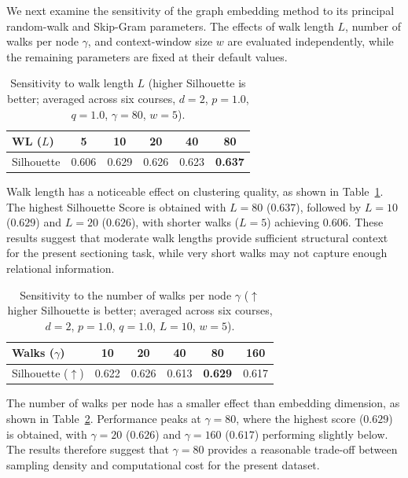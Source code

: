 \documentclass[pdflatex,sn-mathphys-num,iicol]{sn-jnl}%
\theoremstyle{thmstyleone}%
\theoremstyle{thmstyletwo}%
\theoremstyle{thmstylethree}%
\begin{document}
We next examine the sensitivity of the graph embedding method to its principal random-walk and Skip-Gram parameters. The effects of walk length $L$, number of walks per node $\gamma$, and context-window size $w$ are evaluated independently, while the remaining parameters are fixed at their default values.

\begin{table}[t]
\centering
\caption{Sensitivity to walk length $L$ (higher Silhouette is better; averaged across six courses, $d=2$, $p=1.0$, $q=1.0$, $\gamma=80$, $w=5$).}
\label{tab:sensitivity_walk}
\begin{tabular}{lccccc}
\toprule
\textbf{WL ($L$)} & 5 & 10 & 20 & 40 & 80 \\
\midrule
Silhouette& 0.606 & 0.629 & 0.626 & 0.623 & \textbf{0.637} \\
\bottomrule
\end{tabular}
\end{table}

Walk length has a noticeable effect on clustering quality, as shown in Table~\ref{tab:sensitivity_walk}. The highest Silhouette Score is obtained with $L=80$ ($0.637$), followed by $L=10$ ($0.629$) and $L=20$ ($0.626$), with shorter walks ($L=5$) achieving $0.606$. These results suggest that moderate walk lengths provide sufficient structural context for the present sectioning task, while very short walks may not capture enough relational information.

\begin{table}[t]
\centering
\caption{Sensitivity to the number of walks per node $\gamma$ ($\uparrow$ higher Silhouette is better; averaged across six courses, $d=2$, $p=1.0$, $q=1.0$, $L=10$, $w=5$).}
\label{tab:sensitivity_walks}
\begin{tabular}{lccccc}
\toprule
\textbf{Walks ($\gamma$)} & 10 & 20 & 40 & 80 & 160 \\
\midrule
Silhouette ($\uparrow$) & 0.622 & 0.626 & 0.613 & \textbf{0.629} & 0.617 \\
\bottomrule
\end{tabular}
\end{table}

The number of walks per node has a smaller effect than embedding dimension, as shown in Table~\ref{tab:sensitivity_walks}. Performance peaks at $\gamma=80$, where the highest score ($0.629$) is obtained, with $\gamma=20$ ($0.626$) and $\gamma=160$ ($0.617$) performing slightly below. The results therefore suggest that $\gamma=80$ provides a reasonable trade-off between sampling density and computational cost for the present dataset.
\end{document}

